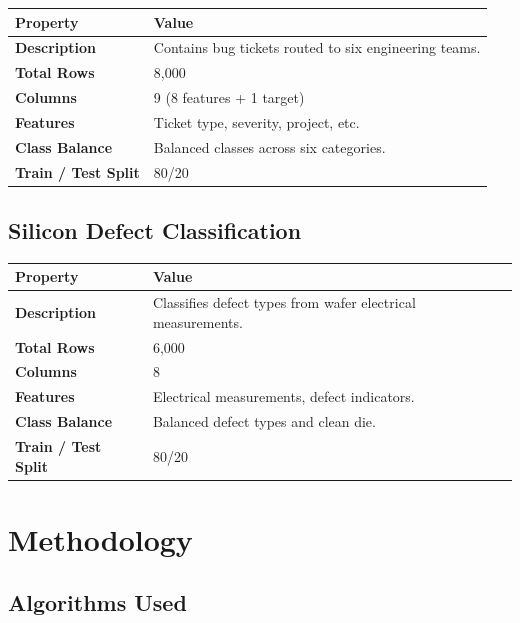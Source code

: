 \documentclass[11pt,a4paper]{article}
\begin{document}
\begin{tabularx}{\linewidth}{@{}>{\bfseries}l X @{}}
  \arrayrulecolor{tableheader}
  \toprule
  \rowcolor{tableheader} Property & Value \\
  \midrule
  \rowcolor{white} Description & Contains bug tickets routed to six engineering teams. \\
  \rowcolor{tablerow} Total Rows & 8,000 \\
  \rowcolor{white} Columns & 9 (8 features + 1 target) \\
  \rowcolor{tablerow} Features & Ticket type, severity, project, etc. \\
  \rowcolor{white} Class Balance & Balanced classes across six categories. \\
  \rowcolor{tablerow} Train / Test Split & 80/20 \\
  \bottomrule
\end{tabularx}

\vspace{6pt}

\subsection{Silicon Defect Classification}

\begin{tabularx}{\linewidth}{@{}>{\bfseries}l X @{}}
  \arrayrulecolor{tableheader}
  \toprule
  \rowcolor{tableheader} Property & Value \\
  \midrule
  \rowcolor{white} Description & Classifies defect types from wafer electrical measurements. \\
  \rowcolor{tablerow} Total Rows & 6,000 \\
  \rowcolor{white} Columns & 8 \\
  \rowcolor{tablerow} Features & Electrical measurements, defect indicators. \\
  \rowcolor{white} Class Balance & Balanced defect types and clean die. \\
  \rowcolor{tablerow} Train / Test Split & 80/20 \\
  \bottomrule
\end{tabularx}

\section{Methodology}

\subsection{Algorithms Used}
\end{document}
